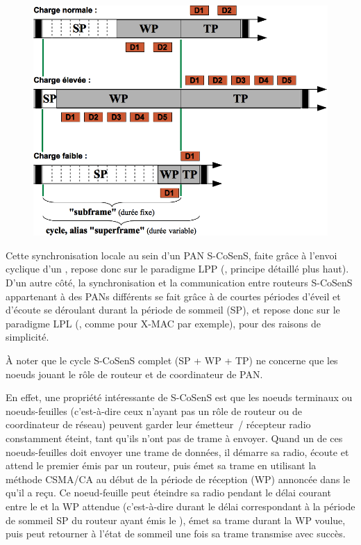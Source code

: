 \begin{figure}[!hbt]
\centering
\includegraphics[width=11.5cm]{images/ch3-s-cosens-cycle.png}
\label{FigCycleSCoSenS}
\end{figure}

Cette synchronisation locale au sein d'un PAN S-CoSenS, faite grâce
à l'envoi cyclique d'un , repose donc sur le paradigme
LPP (, principe détaillé plus haut). D'un
autre côté, la synchronisation et la communication entre routeurs
S-CoSenS appartenant à des PANs différents se fait grâce à de courtes
périodes d'éveil et d'écoute se déroulant durant la période de sommeil
(SP), et repose donc sur le paradigme LPL (,
comme pour X-MAC par exemple), pour des raisons de simplicité.

À noter que le cycle S-CoSenS complet (SP + WP + TP) ne concerne que
les noeuds jouant le rôle de routeur et de coordinateur de PAN.

En effet, une propriété intéressante de S-CoSenS est que les noeuds
terminaux ou noeuds-feuilles (c'est-à-dire ceux n'ayant pas un rôle de
routeur ou de coordinateur de réseau) peuvent garder leur émetteur~/
récepteur radio constamment éteint, tant qu'ils n'ont pas de trame
à envoyer. Quand un de ces noeuds-feuilles doit envoyer une trame de
données, il démarre sa radio, écoute et attend le premier 
émis par un routeur, puis émet sa trame en utilisant la méthode
CSMA/CA au début de la période de réception (WP) annoncée dans le
 qu'il a reçu. Ce noeud-feuille peut éteindre sa radio
pendant le délai courant entre le  et la WP attendue
(c'est-à-dire durant le délai correspondant à la période de sommeil
SP du routeur ayant émis le ), émet sa trame durant
la WP voulue, puis peut retourner à l'état de sommeil une fois sa
trame transmise avec succès.


